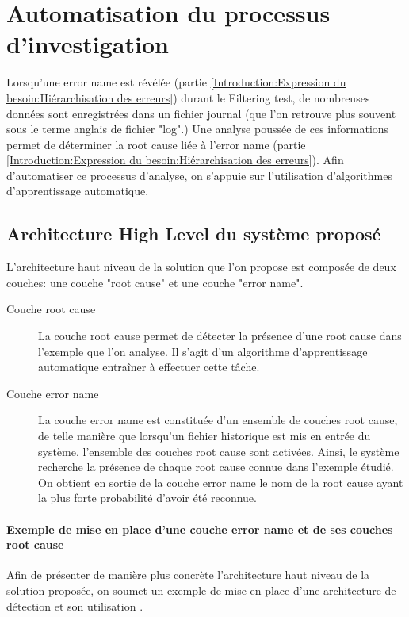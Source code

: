 \chapter{Automatisation du processus d'investigation}
\label{Automatisation du processus d'investigation}
\thispagestyle{fancy}
Lorsqu'une error name est révélée (partie \ref{Introduction:Expression du besoin:Hiérarchisation des erreurs}) durant le Filtering test, de nombreuses données sont enregistrées dans un fichier journal (que l'on retrouve plus souvent sous le terme anglais de fichier "log".) Une analyse poussée de ces informations permet de déterminer la root cause liée à l'error name (partie \ref{Introduction:Expression du besoin:Hiérarchisation des erreurs}). Afin d'automatiser ce processus d'analyse, on s'appuie sur l'utilisation d'algorithmes d'apprentissage automatique. 

\section{Architecture High Level du système proposé}
\label{Automatisation du processus d'investigation: Achitecture High Level du système proposé}
L'architecture haut niveau de la solution que l'on propose est composée de deux couches: une couche "root cause" et une couche "error name".
\begin{description}
	\item [Couche root cause] La couche root cause permet de détecter la présence d'une root cause dans l'exemple que l'on analyse. Il s'agit d'un algorithme d'apprentissage automatique entraîner à effectuer cette tâche.
	\item [Couche error name] La couche error name est constituée d'un ensemble de couches root cause, de telle manière que lorsqu'un fichier historique est mis en entrée du système, l'ensemble des couches root cause sont activées. Ainsi, le système recherche la présence de chaque root cause connue dans l'exemple étudié. On obtient en sortie de la couche error name le nom de la root cause ayant la plus forte probabilité d'avoir été reconnue.
\end{description} 

\subsubsection{Exemple de mise en place  d'une couche error name et de ses couches root cause}
Afin de présenter de manière plus concrète l'architecture haut niveau de la solution proposée, on soumet un exemple de mise en place d'une architecture de détection et son utilisation . \\

